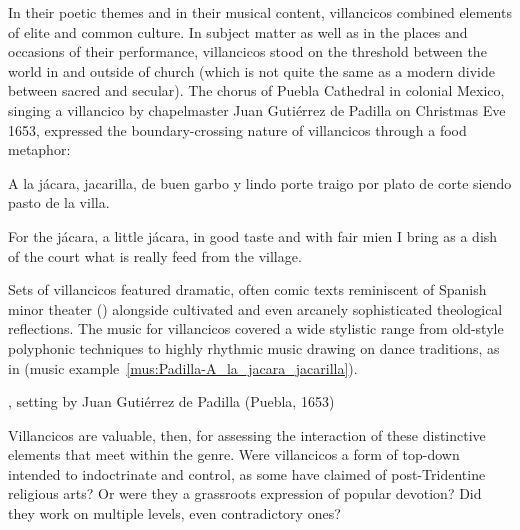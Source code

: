In their poetic themes and in their musical content, villancicos combined elements of elite and common culture. 
In subject matter as well as in the places and occasions of their performance, villancicos stood on the threshold between the world in and outside of church (which is not quite the same as a modern divide between sacred and secular). 
The chorus of Puebla Cathedral in colonial Mexico, singing a villancico by chapelmaster Juan Gutiérrez de Padilla on Christmas Eve 1653, expressed the boundary-crossing nature of villancicos through a food metaphor:
%
\begin{poemtranslation}
\begin{original}
A la jácara, jacarilla,
de buen garbo y lindo porte
traigo por plato de corte
siendo pasto de la villa.
\end{original}
\begin{translation}
For the jácara, a little jácara,
in good taste and with fair mien
I bring as a dish of the court
what is really feed from the village.
\end{translation}
\end{poemtranslation}
%
Sets of villancicos featured dramatic, often comic texts reminiscent of Spanish minor theater () alongside cultivated and even arcanely sophisticated theological reflections.
The music for villancicos covered a wide stylistic range from old-style polyphonic techniques to highly rhythmic music drawing on dance traditions, as in  (music example~\ref{mus:Padilla-A_la_jacara_jacarilla}).

\begin{musicexample}
\caption{, setting by Juan Gutiérrez de Padilla (Puebla, 1653)}
\label{mus:Padilla-A_la_jacara_jacarilla}
\end{musicexample}

Villancicos are valuable, then, for assessing the interaction of these distinctive elements that meet within the genre.
Were villancicos a form of top-down  intended to indoctrinate and control, as some have claimed of post-Tridentine religious arts?
Or were they a grassroots expression of popular devotion? 
Did they work on multiple levels, even contradictory ones?

